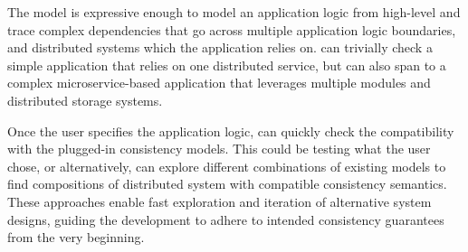 The \sysgraph{} model is expressive enough to model an application logic
from high-level and trace complex dependencies that go across multiple
application logic boundaries, and distributed systems which the application
relies on. \sysname{} can trivially check a simple application that
relies on one distributed service, but can also span to a complex
microservice-based application that leverages multiple modules and
distributed storage systems.

Once the user specifies the application logic, \sysname{} can quickly
check the compatibility with the plugged-in consistency models. This
could be testing what the user chose, or alternatively, \sysname{}
can explore different combinations of existing models to
find compositions of distributed system with compatible consistency semantics.
These approaches enable fast exploration and iteration of alternative
system designs, guiding the development to adhere to intended
consistency guarantees from the very beginning.


